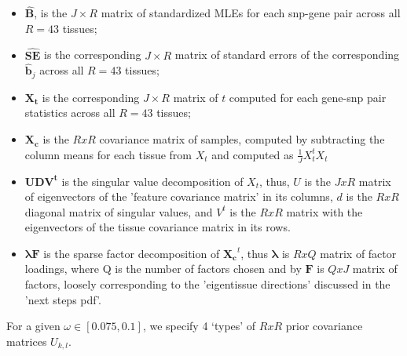 \documentclass[10pt]{article}
\newcommand{\tmat}{\mathbf{X_{t}}}
\newcommand{\tcen}{\mathbf{X_{c}}}
\newcommand{\svd}{\mathbf{U} \mathbf{D} \mathbf{V^{t}}}
\newcommand{\pcv}{\mathbf{V}}
\newcommand{\pcd}{\mathbf{D}}
\newcommand{\sfa}{\mathbf{\lambda}\mathbf{F}}
\newcommand{\sfat}{\mathbf{F}^{t}\mathbf{\lambda}^{t}}
\begin{document}
\begin{itemize}
\item $\mathbf{\hat{B}}$, is the $J \times R$ matrix of standardized MLEs for each snp-gene pair across all $R=43$ tissues;
\item $\mathbf{\hat{SE}}$ is the corresponding $J \times R$ matrix of standard errors of the corresponding $\hat{\bm{b}}_{j}$ across all $R=43$ tissues;
\item $\tmat$ is the corresponding $J \times R$ matrix of $t$ computed for each gene-snp pair statistics across all $R=43$ tissues;
\item $\tcen$ is the $RxR$ covariance matrix of samples, computed by subtracting the column means for each tissue from $X_{t}$ and computed as $\frac{1}{J} X_{t}^{t} X_{t}$
\item $\svd$ is the singular value decomposition of $X_{t}$, thus, $U$ is the $JxR$ matrix of eigenvectors of the 'feature covariance matrix' in its columns, $d$ is the $RxR$ diagonal matrix of singular values, and $V^{t}$ is the $RxR$ matrix with the eigenvectors of the tissue covariance matrix in its rows.
\item $\sfa$ is the sparse factor decomposition of $\tcen^{t}$, thus ${\mathbf{\lambda}}$ is $RxQ$ matrix of factor loadings, where Q is the number of factors chosen and by  ${\mathbf{F}}$ is $QxJ$ matrix of factors, loosely corresponding to the 'eigentissue directions' discussed in the 'next steps pdf'.

\end{itemize}



For a given $\omega \in [0.075, 0.1]$, we specify 4 `types' of $RxR$ prior covariance matrices $U_{k,l}$.
\end{document}
